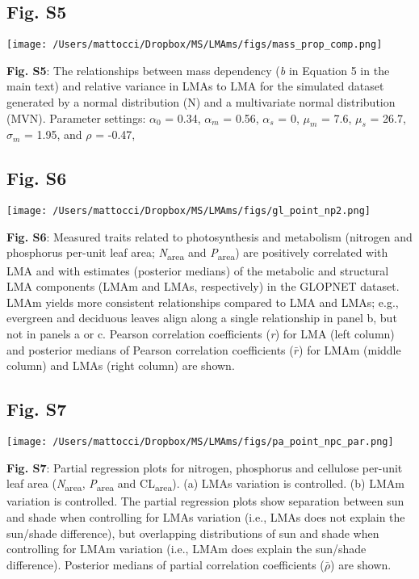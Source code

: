 \documentclass[
  12pt,
  letterpaper,
  DIV=11,
  numbers=noendperiod]{scrartcl}
\begin{document}
\newpage

\hypertarget{fig.-s5}{%
\subsection{Fig. S5}\label{fig.-s5}}

\texttt{[image: /Users/mattocci/Dropbox/MS/LMAms/figs/mass\_prop\_comp.png]}

\textbf{Fig. S5}: The relationships between mass dependency (\emph{b} in
Equation 5 in the main text) and relative variance in LMAs to LMA for
the simulated dataset generated by a normal distribution (N) and a
multivariate normal distribution (MVN). Parameter settings: \(\alpha_0\)
= 0.34, \(\alpha_m\) = 0.56, \(\alpha_s\) = 0, \(\mu_m\) = 7.6,
\(\mu_s\) = 26.7, \(\sigma_m\) = 1.95, and \(\rho\) = -0.47,

\newpage

\hypertarget{fig.-s6}{%
\subsection{Fig. S6}\label{fig.-s6}}

\texttt{[image: /Users/mattocci/Dropbox/MS/LMAms/figs/gl\_point\_np2.png]}

\textbf{Fig. S6}: Measured traits related to photosynthesis and
metabolism (nitrogen and phosphorus per-unit leaf area;
\emph{N}\textsubscript{area} and \emph{P}\textsubscript{area}) are
positively correlated with LMA and with estimates (posterior medians) of
the metabolic and structural LMA components (LMAm and LMAs,
respectively) in the GLOPNET dataset. LMAm yields more consistent
relationships compared to LMA and LMAs; e.g., evergreen and deciduous
leaves align along a single relationship in panel b, but not in panels a
or c. Pearson correlation coefficients (\emph{r}) for LMA (left column)
and posterior medians of Pearson correlation coefficients (\(\bar{r}\))
for LMAm (middle column) and LMAs (right column) are shown.

\newpage

\hypertarget{fig.-s7}{%
\subsection{Fig. S7}\label{fig.-s7}}

\texttt{[image: /Users/mattocci/Dropbox/MS/LMAms/figs/pa\_point\_npc\_par.png]}

\textbf{Fig. S7}: Partial regression plots for nitrogen, phosphorus and
cellulose per-unit leaf area (\emph{N}\textsubscript{area},
\emph{P}\textsubscript{area} and CL\textsubscript{area}). (a) LMAs
variation is controlled. (b) LMAm variation is controlled. The partial
regression plots show separation between sun and shade when controlling
for LMAs variation (i.e., LMAs does not explain the sun/shade
difference), but overlapping distributions of sun and shade when
controlling for LMAm variation (i.e., LMAm does explain the sun/shade
difference). Posterior medians of partial correlation coefficients
(\(\bar{\rho}\)) are shown.
\end{document}
